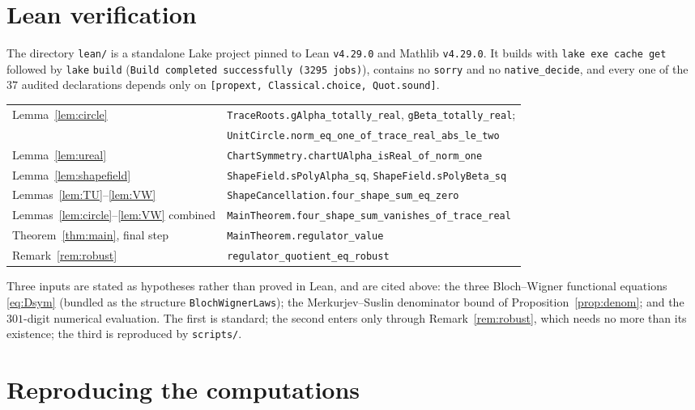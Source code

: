 \documentclass[11pt]{article}
\theoremstyle{remark}
\begin{document}
\section{Lean verification}\label{sec:lean}

The directory \texttt{lean/} is a standalone Lake project pinned to Lean
\texttt{v4.29.0} and Mathlib \texttt{v4.29.0}. It builds with
\texttt{lake exe cache get} followed by \texttt{lake} \texttt{build}
(\texttt{Build completed successfully (3295 jobs)}), contains no \texttt{sorry}
and no \texttt{native\_decide}, and every one of the $37$ audited declarations
depends only on \texttt{[propext, Classical.choice, Quot.sound]}.

\begin{center}
\begin{tabular}{ll}
\hline
Lemma~\ref{lem:circle} & \texttt{TraceRoots.gAlpha\_totally\_real},
\texttt{gBeta\_totally\_real};\\
& \texttt{UnitCircle.norm\_eq\_one\_of\_trace\_real\_abs\_le\_two}\\
Lemma~\ref{lem:ureal} & \texttt{ChartSymmetry.chartUAlpha\_isReal\_of\_norm\_one}\\
Lemma~\ref{lem:shapefield} & \texttt{ShapeField.sPolyAlpha\_sq},
\texttt{ShapeField.sPolyBeta\_sq}\\
Lemmas~\ref{lem:TU}--\ref{lem:VW} &
\texttt{ShapeCancellation.four\_shape\_sum\_eq\_zero}\\
Lemmas~\ref{lem:circle}--\ref{lem:VW} combined &
\texttt{MainTheorem.four\_shape\_sum\_vanishes\_of\_trace\_real}\\
Theorem~\ref{thm:main}, final step & \texttt{MainTheorem.regulator\_value}\\
Remark~\ref{rem:robust} & \texttt{regulator\_quotient\_eq\_robust}\\
\hline
\end{tabular}
\end{center}

Three inputs are stated as hypotheses rather than proved in Lean, and are cited
above: the three Bloch--Wigner functional equations \eqref{eq:Dsym} (bundled as
the structure \texttt{BlochWignerLaws}); the Merkurjev--Suslin denominator bound
of Proposition~\ref{prop:denom}; and the $301$-digit numerical evaluation. The
first is standard; the second enters only through Remark~\ref{rem:robust}, which
needs no more than its existence; the third is reproduced by \texttt{scripts/}.

\section{Reproducing the computations}
\end{document}
